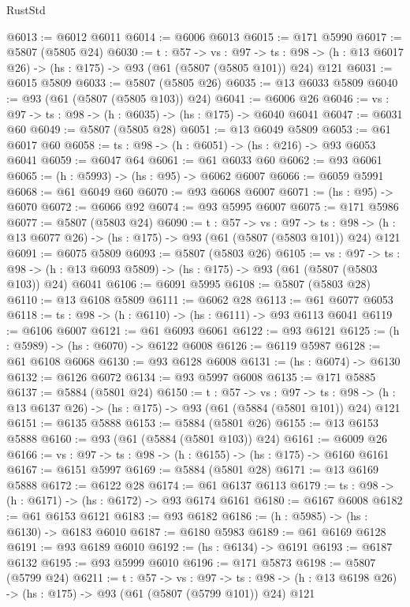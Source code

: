 \begin{lexlean}{RustStd}
\begin{coremodule}
@6013 := @6012 @6011
@6014 := @6006 @6013
@6015 := @171 @5990
@6017 := @5807 (@5805 @24)
@6030 := {t : @57} ->
  {vs : @97} ->
  {ts : @98} -> (h : @13 @6017 @26) -> (hs : @175) -> @93 (@61 (@5807 (@5805 @101)) @24) @121
@6031 := @6015 @5809
@6033 := @5807 (@5805 @26)
@6035 := @13 @6033 @5809
@6040 := @93 (@61 (@5807 (@5805 @103)) @24)
@6041 := @6006 @26
@6046 := {vs : @97} -> {ts : @98} -> (h : @6035) -> (hs : @175) -> @6040 @6041
@6047 := @6031 @60
@6049 := @5807 (@5805 @28)
@6051 := @13 @6049 @5809
@6053 := @61 @6017 @60
@6058 := {ts : @98} -> (h : @6051) -> (hs : @216) -> @93 @6053 @6041
@6059 := @6047 @64
@6061 := @61 @6033 @60
@6062 := @93 @6061
@6065 := (h : @5993) -> (hs : @95) -> @6062 @6007
@6066 := @6059 @5991
@6068 := @61 @6049 @60
@6070 := @93 @6068 @6007
@6071 := (hs : @95) -> @6070
@6072 := @6066 @92
@6074 := @93 @5995 @6007
@6075 := @171 @5986
@6077 := @5807 (@5803 @24)
@6090 := {t : @57} ->
  {vs : @97} ->
  {ts : @98} -> (h : @13 @6077 @26) -> (hs : @175) -> @93 (@61 (@5807 (@5803 @101)) @24) @121
@6091 := @6075 @5809
@6093 := @5807 (@5803 @26)
@6105 := {vs : @97} ->
  {ts : @98} -> (h : @13 @6093 @5809) -> (hs : @175) -> @93 (@61 (@5807 (@5803 @103)) @24) @6041
@6106 := @6091 @5995
@6108 := @5807 (@5803 @28)
@6110 := @13 @6108 @5809
@6111 := @6062 @28
@6113 := @61 @6077 @6053
@6118 := {ts : @98} -> (h : @6110) -> (hs : @6111) -> @93 @6113 @6041
@6119 := @6106 @6007
@6121 := @61 @6093 @6061
@6122 := @93 @6121
@6125 := (h : @5989) -> (hs : @6070) -> @6122 @6008
@6126 := @6119 @5987
@6128 := @61 @6108 @6068
@6130 := @93 @6128 @6008
@6131 := (hs : @6074) -> @6130
@6132 := @6126 @6072
@6134 := @93 @5997 @6008
@6135 := @171 @5885
@6137 := @5884 (@5801 @24)
@6150 := {t : @57} ->
  {vs : @97} ->
  {ts : @98} -> (h : @13 @6137 @26) -> (hs : @175) -> @93 (@61 (@5884 (@5801 @101)) @24) @121
@6151 := @6135 @5888
@6153 := @5884 (@5801 @26)
@6155 := @13 @6153 @5888
@6160 := @93 (@61 (@5884 (@5801 @103)) @24)
@6161 := @6009 @26
@6166 := {vs : @97} -> {ts : @98} -> (h : @6155) -> (hs : @175) -> @6160 @6161
@6167 := @6151 @5997
@6169 := @5884 (@5801 @28)
@6171 := @13 @6169 @5888
@6172 := @6122 @28
@6174 := @61 @6137 @6113
@6179 := {ts : @98} -> (h : @6171) -> (hs : @6172) -> @93 @6174 @6161
@6180 := @6167 @6008
@6182 := @61 @6153 @6121
@6183 := @93 @6182
@6186 := (h : @5985) -> (hs : @6130) -> @6183 @6010
@6187 := @6180 @5983
@6189 := @61 @6169 @6128
@6191 := @93 @6189 @6010
@6192 := (hs : @6134) -> @6191
@6193 := @6187 @6132
@6195 := @93 @5999 @6010
@6196 := @171 @5873
@6198 := @5807 (@5799 @24)
@6211 := {t : @57} ->
  {vs : @97} ->
  {ts : @98} -> (h : @13 @6198 @26) -> (hs : @175) -> @93 (@61 (@5807 (@5799 @101)) @24) @121

\end{coremodule}
\end{lexlean}
